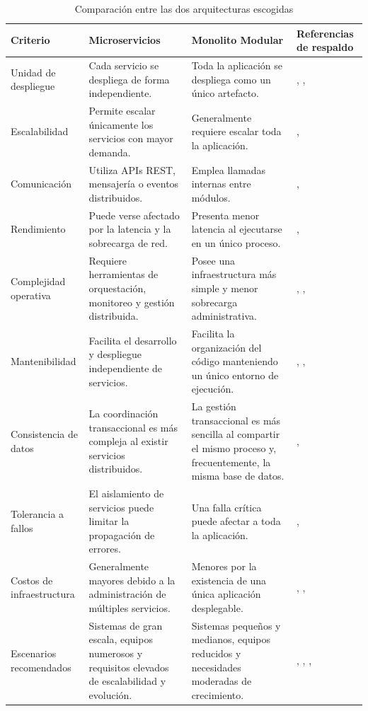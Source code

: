 \documentclass[10pt,conference]{IEEEtran}
\begin{document}
\begin{table}[!t]
\renewcommand{\arraystretch}{1.3}
\caption{Comparación entre las dos arquitecturas escogidas}
\label{tab:comparacion}
\centering
\begin{tabular}{|p{2.2cm}|p{6.5cm}|p{6.5cm}|p{1.5cm}|}
\hline
\textbf{Criterio} & \textbf{Microservicios} & \textbf{Monolito Modular} & \textbf{Referencias de respaldo} \\
\hline
Unidad de despliegue & Cada servicio se despliega de forma independiente. & Toda la aplicación se despliega como un único artefacto. & \cite{ref9}, \cite{ref18}, \cite{ref1} \\
\hline
Escalabilidad & Permite escalar únicamente los servicios con mayor demanda. & Generalmente requiere escalar toda la aplicación. & \cite{ref20}, \cite{ref10} \\
\hline
Comunicación & Utiliza APIs REST, mensajería o eventos distribuidos. & Emplea llamadas internas entre módulos. & \cite{ref13}, \cite{ref21} \\
\hline
Rendimiento & Puede verse afectado por la latencia y la sobrecarga de red. & Presenta menor latencia al ejecutarse en un único proceso. & \cite{ref13}, \cite{ref21} \\
\hline
Complejidad operativa & Requiere herramientas de orquestación, monitoreo y gestión distribuida. & Posee una infraestructura más simple y menor sobrecarga administrativa. & \cite{ref18}, \cite{ref11}, \cite{ref19} \\
\hline
Mantenibilidad & Facilita el desarrollo y despliegue independiente de servicios. & Facilita la organización del código manteniendo un único entorno de ejecución. & \cite{ref9}, \cite{ref18}, \cite{ref11} \\
\hline
Consistencia de datos & La coordinación transaccional es más compleja al existir servicios distribuidos. & La gestión transaccional es más sencilla al compartir el mismo proceso y, frecuentemente, la misma base de datos. & \cite{ref1}, \cite{ref2} \\
\hline
Tolerancia a fallos & El aislamiento de servicios puede limitar la propagación de errores. & Una falla crítica puede afectar a toda la aplicación. & \cite{ref1}, \cite{ref2} \\
\hline
Costos de infraestructura & Generalmente mayores debido a la administración de múltiples servicios. & Menores por la existencia de una única aplicación desplegable. & \cite{ref18}, \cite{ref20}, \cite{ref19} \\
\hline
Escenarios recomendados & Sistemas de gran escala, equipos numerosos y requisitos elevados de escalabilidad y evolución. & Sistemas pequeños y medianos, equipos reducidos y necesidades moderadas de crecimiento. & \cite{ref9}, \cite{ref20}, \cite{ref10}, \cite{ref19} \\
\hline
\end{tabular}
\end{table}
\end{document}
